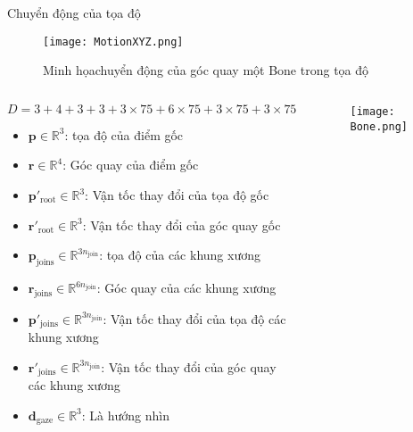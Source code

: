 \begin{frame}{Chuyển động của tọa độ}
		\begin{figure}
		\centering
		\texttt{[image: MotionXYZ.png]}
		\caption{Minh họachuyển động của góc quay một Bone trong tọa độ}
	\end{figure}
	\vspace{-15pt}
	\begin{columns}
		\begin{column}{0.78\textwidth}
			$$
			D = 3 + 4 + 3 + 3 + 3 \times 75 + 6 \times 75 + 3 \times 75 + 3 \times 75 + 3
			$$
			\vspace{-20pt}
			\begin{itemize}
				\item $\mathbf{p} \in \mathbb{R}^3$: tọa độ của điểm gốc
				\item $\mathbf{r} \in \mathbb{R}^4$: Góc quay của điểm gốc
				\item $\mathbf{p}'_{\text{root}} \in \mathbb{R}^3$: Vận tốc thay đổi của tọa độ gốc
				\item $\mathbf{r}'_{\text{root}} \in \mathbb{R}^3$: Vận tốc thay đổi của góc quay gốc
				
				\item $\mathbf{p}_{\text{joins}} \in \mathbb{R}^{3 n_{\text{join} }}$: tọa độ của các khung xương
				\item $\mathbf{r}_{\text{joins}} \in \mathbb{R}^{6 n_{\text{join} }}$: Góc quay của các khung xương
				\item $\mathbf{p}'_{\text{joins}} \in \mathbb{R}^{3n_{\text{join} }}$: Vận tốc thay đổi của tọa độ các khung xương
				\item $\mathbf{r}'_{\text{joins}} \in \mathbb{R}^{3n_{\text{join} }}$: Vận tốc thay đổi của góc quay các khung xương
				
				\item $\mathbf{d}_{\text{gaze}} \in \mathbb{R}^3$: Là hướng nhìn
			\end{itemize}
		\end{column}
		
		\begin{column}{0.22\textwidth}
			\vspace{12pt}
			\begin{figure}
				\centering
				\texttt{[image: Bone.png]}
			\end{figure}
			
		\end{column}
	\end{columns}
	
\end{frame}

